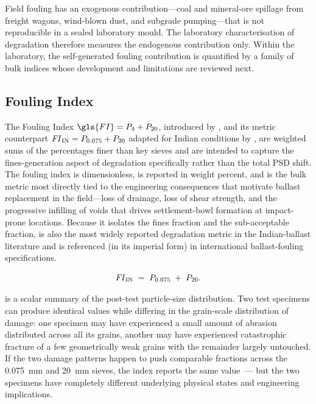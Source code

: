 Field fouling has an exogenous contribution---coal and mineral-ore
spillage from freight wagons, wind-blown dust, and subgrade pumping---that
is not reproducible in a sealed laboratory mould. The laboratory
characterisation of degradation therefore measures the endogenous
contribution only. Within the laboratory, the self-generated fouling
contribution is quantified by a family of bulk indices whose development
and limitations are reviewed next.

\subsection{Fouling Index}
\label{sec:lit-fouling-index}

The Fouling Index $\gls{FI}=P_{4}+P_{20}$, introduced by \citet{Selig1994},
and its metric counterpart $\mathit{FI}_{\mathrm{IN}}=P_{0.075}+P_{20}$ adapted for Indian
conditions by \citet{Anbazhagan2012}, are weighted sums of the percentages
finer than key sieves and are intended to capture the fines-generation
aspect of degradation specifically rather than the total \gls{PSD} shift.
The fouling index is dimensionless, is reported in weight percent, and is
the bulk metric most directly tied to the engineering consequences that
motivate ballast replacement in the field---loss of drainage, loss of
shear strength, and the progressive infilling of voids that drives
settlement-bowl formation at impact-prone locations. Because it isolates
the fines fraction and the sub-acceptable fraction, \FIIN{} is also the
most widely reported degradation metric in the Indian-ballast literature
and is referenced (in its imperial form) in international ballast-fouling
specifications.

\begin{equation}
    \mathit{FI}_{\mathrm{IN}} \;=\; P_{0.075} \;+\; P_{20}.
    \label{eq:FIIN-def}
\end{equation}

\begin{caveat}[title=The structural blind spot of $\FIIN$]
\FIIN{} is a scalar summary of the post-test particle-size distribution.
Two test specimens can produce identical \FIIN{} values while differing
in the grain-scale distribution of damage: one specimen may have
experienced a small amount of abrasion distributed across all its
grains, another may have experienced catastrophic fracture of a few
geometrically weak grains with the remainder largely untouched. If the
two damage patterns happen to push comparable fractions across the
\SI{0.075}{\milli\metre} and \SI{20}{\milli\metre} sieves, the index
reports the same value~--- but the two specimens have completely
different underlying physical states and engineering implications.
\end{caveat}

